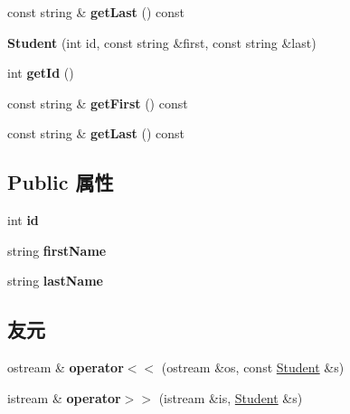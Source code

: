 \begin{DoxyCompactItemize}
const string \& {\bfseries get\+Last} () const
\item 
\mbox{\label{struct_student_a695746a6d5d07bdd7490dc5e2e643065}} 
{\bfseries Student} (int id, const string \&first, const string \&last)
\item 
\mbox{\label{struct_student_a78a58b686f5fe10a925cf5c9881d4b4e}} 
int {\bfseries get\+Id} ()
\item 
\mbox{\label{struct_student_a65d707a5139471b0bd79bd875940daf0}} 
const string \& {\bfseries get\+First} () const
\item 
\mbox{\label{struct_student_a94ea3dc95b6f86325495e44a88cdab5b}} 
const string \& {\bfseries get\+Last} () const
\end{DoxyCompactItemize}
\subsection*{Public 属性}
\begin{DoxyCompactItemize}
\item 
\mbox{\label{struct_student_a1351fb239711a78a8b115d75597b5df0}} 
int {\bfseries id}
\item 
\mbox{\label{struct_student_ac7b61b77aa291fec4fbe44c0f3c96baf}} 
string {\bfseries first\+Name}
\item 
\mbox{\label{struct_student_ae660ceb31c44933b05829a2cec8b9283}} 
string {\bfseries last\+Name}
\end{DoxyCompactItemize}
\subsection*{友元}
\begin{DoxyCompactItemize}
\item 
\mbox{\label{struct_student_a431f957137df88968a23ce7a10101e1d}} 
ostream \& {\bfseries operator$<$$<$} (ostream \&os, const \mbox{\hyperlink{struct_student}{Student}} \&s)
\item 
\mbox{\label{struct_student_af05e6bec0884ddf4d7c1ac6cb247b722}} 
istream \& {\bfseries operator$>$$>$} (istream \&is, \mbox{\hyperlink{struct_student}{Student}} \&s)
\end{DoxyCompactItemize}


